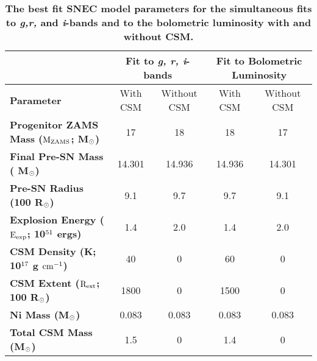 \documentclass[a4paper,fleqn,usenatbib]{mnras}
\newcommand{\msunperiod}{M$\rm{_{\odot}}$}
\begin{document}
\begin{table*}
\centering
\caption{\textbf{The best fit SNEC model parameters for the simultaneous fits to {\it g,r,} and {\it i}-bands and to the bolometric luminosity with and without CSM.}}
\label{tab:BestModel}
\begin{tabular}{l|c|c|c|c|}
\hline
                                                                                            &\multicolumn{2}{|c|}{\textbf{Fit to {\it g, r, i}-bands}} &\multicolumn{2}{|c|}{\textbf{Fit to Bolometric Luminosity}}\\
\hline
\textbf{ Parameter}                                                                          & With CSM            & Without CSM     & With CSM & Without CSM\\
\hline
\textbf{Progenitor ZAMS Mass ($\rm{M_{ZAMS}}$; \msunperiod)} &   17                    &     18                    &   18            &17\\
\textbf{Final Pre-SN Mass ( \msunperiod)}                          &   14.301             &      14.936            &     14.936    &14.301\\
\textbf{Pre-SN Radius (100 R$\rm{_{\odot}}$) }                   &  9.1                    &      9.7                  &       9.7       &9.1\\
\textbf{Explosion Energy ($\rm{E_{exp}}$; 10$\rm{^{51}}$ ergs)    }&    1.4                 &     2.0                 &     1.4             &2.0 \\
\textbf{CSM Density (K; 10$\rm{^{17}}$ g $\rm{cm^{-1}}$)             }&     40                  &     0                    &       60           &0 \\
\textbf{CSM Extent ($\rm{R_{ext}}$; 100 R$\rm{_{\odot}}$)            }&     1800              &     0                     &      1500       &0 \\
\textbf{Ni Mass (\msunperiod)                                                         }&     0.083               &    0.083              &    0.083       &0.083\\
\textbf{Total CSM Mass (\msunperiod)                                            }& 1.5                      &          0               &    1.4            &   0 \\
\hline
\end{tabular}
\end{table*}
\end{document}

